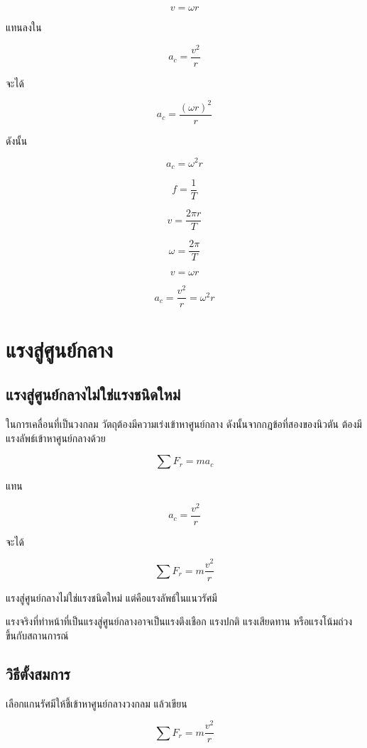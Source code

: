 \[
v=\omega r
\]

แทนลงใน

\[
a_c=\frac{v^2}{r}
\]

จะได้

\[
a_c=\frac{(\omega r)^2}{r}
\]

ดังนั้น

\[
a_c=\omega^2r
\]

\begin{tcolorbox}[title=สูตรพื้นฐานของการเคลื่อนที่เป็นวงกลม]
\[
f=\frac{1}{T}
\]

\[
v=\frac{2\pi r}{T}
\]

\[
\omega=\frac{2\pi}{T}
\]

\[
v=\omega r
\]

\[
a_c=\frac{v^2}{r}=\omega^2r
\]
\end{tcolorbox}

\section{แรงสู่ศูนย์กลาง}

\subsection{แรงสู่ศูนย์กลางไม่ใช่แรงชนิดใหม่}

ในการเคลื่อนที่เป็นวงกลม วัตถุต้องมีความเร่งเข้าหาศูนย์กลาง ดังนั้นจากกฎข้อที่สองของนิวตัน ต้องมีแรงลัพธ์เข้าหาศูนย์กลางด้วย

\[
\sum F_r=ma_c
\]

แทน

\[
a_c=\frac{v^2}{r}
\]

จะได้

\[
\sum F_r=m\frac{v^2}{r}
\]

\begin{tcolorbox}[title=แนวคิดสำคัญ]
แรงสู่ศูนย์กลางไม่ใช่แรงชนิดใหม่ แต่คือแรงลัพธ์ในแนวรัศมี

แรงจริงที่ทำหน้าที่เป็นแรงสู่ศูนย์กลางอาจเป็นแรงตึงเชือก แรงปกติ แรงเสียดทาน หรือแรงโน้มถ่วง ขึ้นกับสถานการณ์
\end{tcolorbox}

\subsection{วิธีตั้งสมการ}

เลือกแกนรัศมีให้ชี้เข้าหาศูนย์กลางวงกลม แล้วเขียน

\[
\sum F_r=m\frac{v^2}{r}
\]

